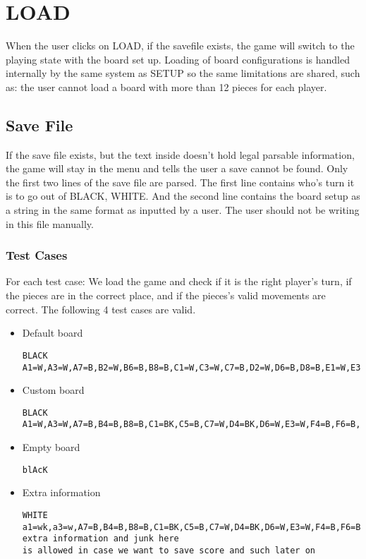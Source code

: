 \documentclass{article}
\begin{document}
\section{LOAD} \label{a2:s:load}
When the user clicks on LOAD, if the savefile exists, the game will switch to the playing state with the board set up.
Loading of board configurations is handled internally by the same system as SETUP so the same limitations are shared,
such as: the user cannot load a board with more than 12 pieces for each player.

\subsection{Save File}
If the save file exists, but the text inside doesn't hold legal parsable information, the game will stay in the menu and tells the user a save cannot be found.
Only the first two lines of the save file are parsed. The first line contains who's turn it is to go out of {BLACK, WHITE}.
And the second line contains the board setup as a string in the same format as inputted by a user.
The user should not be writing in this file manually.

\subsubsection*{Test Cases}
For each test case:
We load the game and check if it is the right player's turn, if the pieces are in the correct place, and if the pieces's valid movements are correct.
The following 4 test cases are valid.

\begin{itemize}
\item Default board\hfill
\begin{lstlisting}
BLACK
A1=W,A3=W,A7=B,B2=W,B6=B,B8=B,C1=W,C3=W,C7=B,D2=W,D6=B,D8=B,E1=W,E3=W,E7=B,F2=W,F6=B,F8=B,G1=W,G3=W,G7=B,H2=W,H6=B,H8=B
\end{lstlisting}

\item Custom board\hfill 
\begin{lstlisting}
BLACK
A1=W,A3=W,A7=B,B4=B,B8=B,C1=BK,C5=B,C7=W,D4=BK,D6=W,E3=W,F4=B,F6=B,F8=WK,G1=W,G3=W,G5=W,G7=WK,H6=B
\end{lstlisting}

\item Empty board\hfill 
\begin{lstlisting}
blAcK

\end{lstlisting}

\item Extra information\hfill 
\begin{lstlisting}
WHITE
a1=wk,a3=w,A7=B,B4=B,B8=B,C1=BK,C5=B,C7=W,D4=BK,D6=W,E3=W,F4=B,F6=B,F8=WK,G1=W,G3=W,G5=W,G7=WK,H6=B
extra information and junk here
is allowed in case we want to save score and such later on

\end{lstlisting}
\end{itemize}
\end{document}
